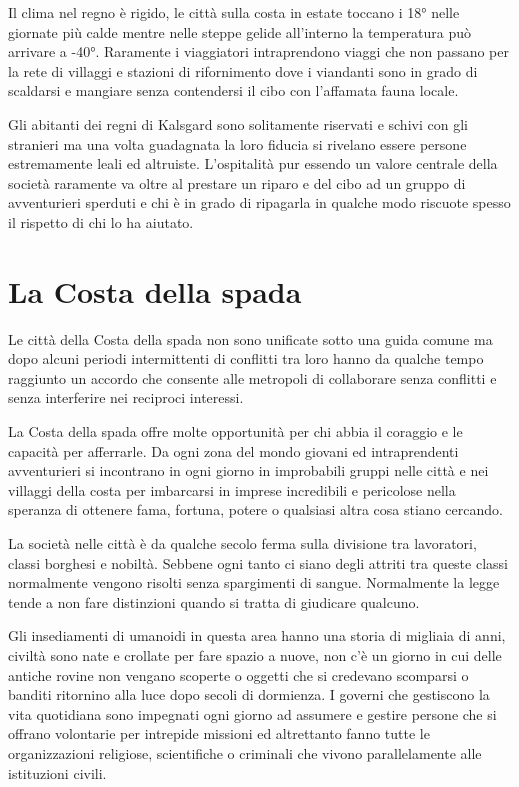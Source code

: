 \documentclass[letterpaper,twocolumn,openany,nodeprecatedcode]{dndbook}
\begin{document}
Il clima nel regno è rigido, le città sulla costa in estate toccano i 18° nelle giornate più calde mentre nelle steppe gelide all'interno la temperatura può arrivare a -40°. Raramente i viaggiatori intraprendono viaggi che non passano per la rete di villaggi e stazioni di rifornimento dove i viandanti sono in grado di scaldarsi e mangiare senza contendersi il cibo con l'affamata fauna locale.

Gli abitanti dei regni di Kalsgard sono solitamente riservati e schivi con gli stranieri ma una volta guadagnata la loro fiducia si rivelano essere persone estremamente leali ed altruiste. L'ospitalità pur essendo un valore centrale della società raramente va oltre al prestare un riparo e del cibo ad un gruppo di avventurieri sperduti e chi è in grado di ripagarla in qualche modo riscuote spesso il rispetto di chi lo ha aiutato. 

\section{La Costa della spada}

Le città della Costa della spada non sono unificate sotto una guida comune ma dopo alcuni periodi intermittenti di conflitti tra loro hanno da qualche tempo raggiunto un accordo che consente alle metropoli di collaborare senza conflitti e senza interferire nei reciproci interessi.

La Costa della spada offre molte opportunità per chi abbia il coraggio e le capacità per afferrarle. Da ogni zona del mondo giovani ed intraprendenti avventurieri si incontrano in ogni giorno in improbabili gruppi nelle città e nei villaggi della costa per imbarcarsi in imprese incredibili e pericolose nella speranza di ottenere fama, fortuna, potere o qualsiasi altra cosa stiano cercando.

La società nelle città è da qualche secolo ferma sulla divisione tra lavoratori, classi borghesi e nobiltà. Sebbene ogni tanto ci siano degli attriti tra queste classi normalmente vengono risolti senza spargimenti di sangue. Normalmente la legge tende a non fare distinzioni quando si tratta di giudicare qualcuno.

Gli insediamenti di umanoidi in questa area hanno una storia di migliaia di anni, civiltà sono nate e crollate per fare spazio a nuove, non c'è un giorno in cui delle antiche rovine non vengano scoperte o oggetti che si credevano scomparsi o banditi ritornino alla luce dopo secoli di dormienza. I governi che gestiscono la vita quotidiana sono impegnati ogni giorno ad assumere e gestire persone che si offrano volontarie per intrepide missioni ed altrettanto fanno tutte le organizzazioni religiose, scientifiche o criminali che vivono parallelamente alle istituzioni civili.
\end{document}

